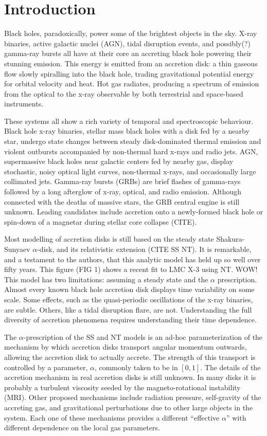 \chapter*{Introduction}

Black holes, paradoxically, power some of the brightest objects in the sky. X-ray binaries, active galactic nuclei (AGN), tidal disruption events, and possibly(?) gamma-ray bursts all have at their core an accreting black hole powering their stunning emission.  This energy is emitted from an accretion disk: a thin gaseous flow slowly spiralling into the black hole, trading gravitational potential energy for orbital velocity and heat.  Hot gas radiates, producing a spectrum of emission from the optical to the x-ray observable by both terrestrial and space-based instruments.  

These systems all show a rich variety of temporal and spectroscopic behaviour.  Black hole x-ray binaries,  stellar mass black holes with a disk fed by a nearby star, undergo state changes between steady disk-dominated thermal emission and violent outbursts accompanied by non-thermal hard x-rays and radio jets.  AGN, supermassive black holes near galactic centers fed by nearby gas, display stochastic, noisy optical light curves, non-thermal x-rays, and occasionally large collimated jets.  Gamma-ray bursts (GRBs) are brief flashes of gamma-rays followed by a long afterglow of x-ray, optical, and radio emission.  Although connected with the deaths of massive stars, the GRB central engine is still unknown.  Leading candidates include accretion onto a newly-formed black hole or spin-down of a magnetar during stellar core collapse (CITE).

Most modelling of accretion disks is still based on the steady state Shakura-Sunyaev $\alpha$-disk, and its relativistic extension (CITE SS NT).  It is remarkable, and a testament to the authors, that this analytic model has held up so well over fifty years.  This figure (FIG 1) shows a recent fit to LMC X-3 using NT.  WOW!  This model has two limitations: assuming a steady state and the $\alpha$ prescription. Almost every known black hole accretion disk displays time variability on some scale.  Some effects, such as the quasi-periodic oscillations of the x-ray binaries, are subtle. Others, like a tidal disruption flare, are not.  Understanding the full diversity of accretion phenomena requires understanding their time dependence.  

The $\alpha$-prescription of the SS and NT models is an ad-hoc parameterization of the mechanism by which accretion disks transport angular momentum outwards, allowing the accretion disk to actually accrete.  The strength of this transport is controlled by a parameter, $\alpha$, commonly taken to be in $[0,1]$.  The details of the accretion mechanism in real accretion disks is still unknown.  In many disks it is probably a turbulent viscosity seeded by the magneto-rotational instability (MRI).  Other proposed mechanisms include radiation pressure, self-gravity of the accreting gas, and gravitational perturbations due to other large objects in the system.  Each one of these mechanisms provides a different ``effective $\alpha$'' with different dependence on the local gas parameters.

